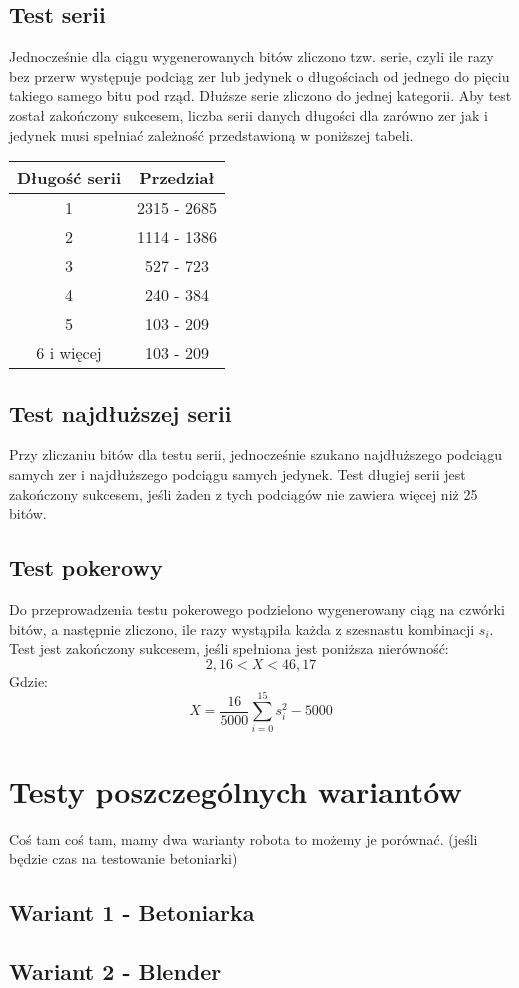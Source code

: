\subsection{Test serii}
Jednocześnie dla ciągu wygenerowanych bitów zliczono tzw. serie, czyli ile razy bez przerw występuje podciąg zer lub 
jedynek o długościach od jednego do pięciu takiego samego bitu pod rząd. Dłuższe serie zliczono do jednej kategorii.
Aby test został zakończony sukcesem, liczba serii danych długości dla zarówno zer jak i jedynek musi spełniać zależność
przedstawioną w poniższej tabeli. 
\begin{center}
    \begin{tabular}{|c|c|} 
        \hline
        Długość serii & Przedział \\
        \hline
        1 & 2315 - 2685 \\
        \hline
        2 & 1114 - 1386 \\
        \hline
        3 & 527 - 723 \\
        \hline
        4 & 240 - 384 \\
        \hline
        5 & 103 - 209 \\
        \hline
        6 i więcej & 103 - 209 \\
        \hline
    \end{tabular}        
\end{center}
\subsection{Test najdłuższej serii}
Przy zliczaniu bitów dla testu serii, jednocześnie szukano najdłuższego podciągu samych zer i najdłuższego podciągu 
samych jedynek. Test długiej serii jest zakończony sukcesem, jeśli żaden z tych podciągów nie zawiera więcej niż 25 bitów.

\subsection{Test pokerowy}
Do przeprowadzenia testu pokerowego podzielono wygenerowany ciąg na czwórki bitów, a następnie zliczono, ile razy 
wystąpiła każda z szesnastu kombinacji \begin{math}s_i\end{math}. Test jest zakończony sukcesem, jeśli spełniona jest
poniższa nierówność:
\begin{displaymath}
    2,16 < X < 46,17
\end{displaymath}
Gdzie:
\begin{displaymath}
    X = \frac{16}{5000} \sum^{15}_{i=0} s_i^2 - 5000
\end{displaymath}


\section{Testy poszczególnych wariantów}
Coś tam coś tam, mamy dwa warianty robota to możemy je porównać. (jeśli będzie czas na testowanie betoniarki)
\subsection{Wariant 1 - \glqq Betoniarka\grqq}
\subsection{Wariant 2 - \glqq Blender\grqq}

